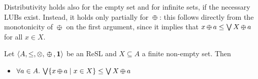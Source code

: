 \documentclass{llncs}
\newcommand{\shortNoProof}[1]{ }
\def\monid{{\mathbf 0}}
\def\monop{\otimes}
\def\odiv{\, {\ominus\hspace{-7.7pt} \div} \,}
\def\monid{\mathbf{1}}
\begin{document}
\shortNoProof{
\begin{proof} Let $X \subseteq A$ be a finite non-empty set. 	
	\[\forall x \in X.\, x \leq \bigvee X %
	\implies \forall x \in X.\, a \monop x \leq a \monop \bigvee X \implies \bigvee \{a \monop x \mid x \in X\} \leq a \monop  \bigvee X .\]

	\[\forall y \in X.\, a \monop y \leq \bigvee \{a \monop x \mid x \in X\} \implies 
	\forall y \in X.\, y \leq (\bigvee \{a \monop x \mid x \in X\}) \odiv a \implies\] 
	\[ \implies \bigvee X \leq (\bigvee \{a \monop x \mid x \in X\}) \odiv a \implies 
	a \monop \bigvee X \leq \bigvee \{a \monop x \mid x \in X\} .\] 
\qed
\end{proof}
}
%
Distributivity holds also for the empty set and for infinite sets, if the necessary LUBs exist.
%
Instead, it holds only partially for $\odiv$: this follows directly from the monotonicity of $\odiv$ on the first argument, 
since it implies that $x \odiv a \leq \bigvee X \odiv a$ for all $x \in X$.

\begin{lemma}
	\label{distodiv}
	Let $\langle A, \leq, \monop, \odiv, \monid \rangle$ be an ReSL and $X \subseteq A$ a finite non-empty set. Then 
	\begin{itemize}
		\item $\forall a \in A.\, \bigvee \{ x \odiv a \mid x \in X \} \leq \bigvee X \odiv a$
	\end{itemize}	
\end{lemma}

\shortNoProof{
\begin{proof}
Straightforward, since by the monotonicity of $\odiv$ in the first argument (Lemma~\ref{mono}) we get
 $\forall x \in X.\,x \odiv a \leq \bigvee X \odiv a$, which implies
 $\bigvee \{ x \odiv a \mid x \in X\} \leq \bigvee X \odiv a$.
\qed
\end{proof}
}
\end{document}
